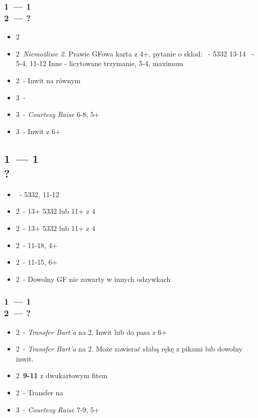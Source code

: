 \documentclass[12pt, a4paper]{article}
\begin{document}
    \subsubsection{1\hearts\ --- 1\ntx \\ 2\diams\ --- ?}
    \begin{itemize}
        \item 2\hearts\ \soff
        \item 2\spades\ \emph{Niemożliwe 2\spades.} Prawie GFowa karta z 4+\diams, pytanie o skład:
        \nt\ - 5332 13-14
        \diams\ - 5-4, 11-12
        \subitem Inne - licytowane trzymanie, 5-4, maximum \gf
        \item 2\nt\ - Inwit na równym
        \item 3\clubs\ - \soff
        \item 3\diams\ - \emph{Courtesy Raise} 6-8, 5+\diams
        \item 3\hearts\ - Inwit z 6+\hearts
    \end{itemize}
    

    \subsection{1\spades\ --- 1\ntx \\ ?}
    \begin{itemize}
        \item \pass\ - 5332, 11-12
        \item 2\clubs\ - 13+ 5332 lub 11+ z 4\clubs
        \item 2\diams\ - 13+ 5332 lub 11+ z 4\diams 
        \item 2\hearts\ - 11-18, 4+\hearts 
        \item 2\spades\ - 11-15, 6+\spades
        \item 2\nt\ - Dowolny GF nie zawarty w innych odzywkach \gf 
    \end{itemize}

    \subsubsection{1\spades\ --- 1\ntx \\ 2\clubs\ --- ?}
    \begin{itemize}
        \item 2\diams\ - \emph{Transfer Bart'a} na 2\hearts.
        Inwit lub do pasa z 6+\hearts
        \item 2\hearts\ - \emph{Transfer Bart'a} na 2\spades.
        Może zawierać słabą rękę z pikami lub dowolny inwit.
        \item 2\spades\ \textbf{9-11} z dwukartowym fitem
        \item 2\nt\ - Transfer na \diams
        \item 3\clubs\ - \emph{Courtesy Raise} 7-9, 5+\clubs
    \end{itemize}
\end{document}
